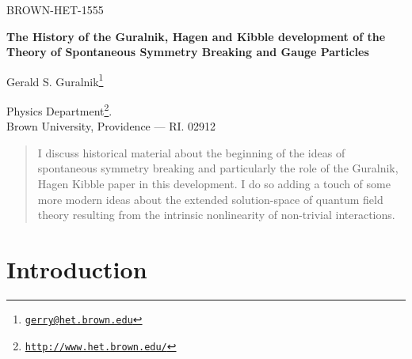 \documentclass[12pt]{article}
\begin{document}
%
\begin{titlepage}
  \begin{flushright}
    {BROWN-HET-1555}
 \end{flushright}
  \bigskip

  \begin{center}
    {\LARGE \textbf{\textsf{The History of the Guralnik, Hagen and Kibble development of the Theory of
          Spontaneous Symmetry Breaking and Gauge Particles}}} \\
    \bigskip

    {\Large \textsf{Gerald S.
        Guralnik\footnote{\href{mailto:gerry@het.brown.edu}{\texttt{gerry@het.brown.edu}}}}} \\
    \bigskip

    \textsf{Physics
      Department\footnote{\href{http://www.het.brown.edu/}{\texttt{http://www.het.brown.edu/}}}.}\\
    \textsf{Brown University, Providence --- RI. 02912}
    \date{\today}
  \end{center}
  \bigskip

\begin{abstract} \noindent I discuss historical material about the beginning
  of the ideas of spontaneous symmetry breaking and
  particularly the role of the Guralnik, Hagen Kibble paper in this development.
 I do so adding a touch of some more modern ideas about the
  extended solution-space of quantum field theory resulting from the intrinsic
  nonlinearity of non-trivial interactions.
\end{abstract}

  \tableofcontents
\end{titlepage}
%
\section{Introduction} \label{sec:0}
\end{document}
